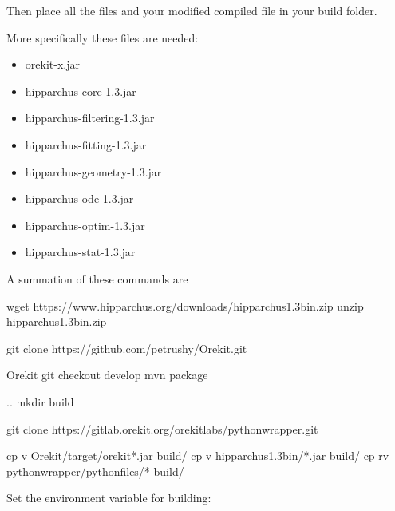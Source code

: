 \documentclass[letterpaper,10pt,english]{sphinxmanual}
\begin{document}
Then place all the  files and your modified compiled  file in your build folder.

More specifically these files are needed:
\begin{itemize}
\item {} 
orekit-x.jar

\item {} 
hipparchus-core-1.3.jar

\item {} 
hipparchus-filtering-1.3.jar

\item {} 
hipparchus-fitting-1.3.jar

\item {} 
hipparchus-geometry-1.3.jar

\item {} 
hipparchus-ode-1.3.jar

\item {} 
hipparchus-optim-1.3.jar

\item {} 
hipparchus-stat-1.3.jar

\end{itemize}

A summation of these commands are

%
\begin{sphinxVerbatim}[commandchars=\\\{\}]
wget https://www.hipparchus.org/downloads/hipparchus\PYGZhy{}1.3\PYGZhy{}bin.zip
unzip hipparchus\PYGZhy{}1.3\PYGZhy{}bin.zip

git clone https://github.com/petrushy/Orekit.git

 Orekit
git checkout develop
 
mvn package

 ..
mkdir build

git clone https://gitlab.orekit.org/orekit\PYGZhy{}labs/python\PYGZhy{}wrapper.git

cp \PYGZhy{}v Orekit/target/orekit*.jar build/
cp \PYGZhy{}v hipparchus\PYGZhy{}1.3\PYGZhy{}bin/*.jar build/
cp \PYGZhy{}rv python\PYGZhy{}wrapper/python\PYGZus{}files/* build/
\end{sphinxVerbatim}

Set the environment variable for building:

%
\begin{sphinxVerbatim}[commandchars=\\\{\}]
 
 
\end{sphinxVerbatim}
\end{document}
